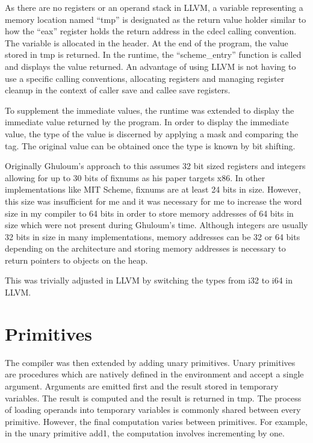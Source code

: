 \documentclass{article}
\begin{document}
As there are no registers or an operand stack in LLVM, a variable representing a memory location named ``tmp'' is designated as the return value holder similar to how the ``eax'' register holds the return address in the cdecl calling convention. The variable is allocated in the header. At the end of the program, the value stored in tmp is returned. In the runtime, the ``scheme\_entry'' function is called and displays the value returned. An advantage of using LLVM is not having to use a specific calling conventions, allocating registers and managing register cleanup in the context of caller save and callee save registers.

To supplement the immediate values, the runtime was extended to display the immediate value returned by the program. In order to display the immediate value, the type of the value is discerned by applying a mask and comparing the tag. The original value can be obtained once the type is known by bit shifting.

Originally Ghuloum's approach to this assumes 32 bit sized registers and integers allowing for up to 30 bits of fixnums as his paper targets x86. In other implementations like MIT Scheme, fixnums are at least 24 bits in size. However, this size was insufficient for me and it was necessary for me to increase the word size in my compiler to 64 bits in order to store memory addresses of 64 bits in size which were not present during Ghuloum's time. Although integers are usually 32 bits in size in many implementations, memory addresses can be 32 or 64 bits depending on the architecture and storing memory addresses is necessary to return pointers to objects on the heap.

This was trivially adjusted in LLVM by switching the types from i32 to i64 in LLVM.

\section{Primitives}

The compiler was then extended by adding unary primitives. Unary primitives are procedures which are natively defined in the environment and accept a single argument. Arguments are emitted first and the result stored in temporary variables. The result is computed and the result is returned in tmp. The process of loading operands into temporary variables is commonly shared between every primitive. However, the final computation varies between primitives. For example, in the unary primitive add1, the computation involves incrementing by one.
\end{document}

